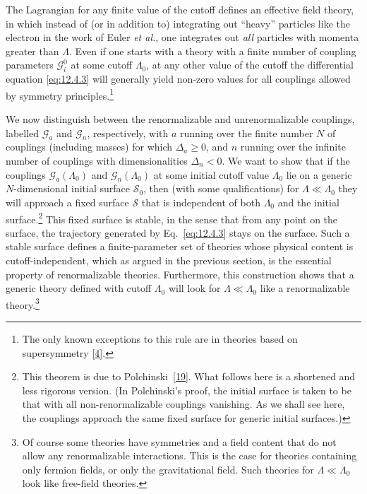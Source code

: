 The Lagrangian for any finite value of the cutoff defines an effective field
theory, in which instead of (or in addition to) integrating out ``heavy''
particles like the electron in the work of Euler \emph{et al.}, one integrates
out \emph{all} particles with momenta greater than $\Lambda$. Even if one
starts with a theory with a finite number of coupling parameters
$\mathcal G_i^0$ at some cutoff $\Lambda_0$, at any other value of the cutoff
the differential equation \eqref{eq:12.4.3} will generally yield non-zero
values for all couplings allowed by symmetry principles.\footnote{The only
known exceptions to this rule are in theories based on supersymmetry
\hyperref[ref:12.4]{[4]}.}

We now distinguish between the renormalizable and unrenormalizable couplings,
labelled $\mathcal G_a$ and $\mathcal G_n$, respectively, with $a$ running over
the finite number $N$ of couplings (including masses) for which
$\Delta_a\geq 0$, and $n$ running over the infinite number of couplings with
dimensionalities $\Delta_n<0$. We want to show that if the couplings
$\mathcal G_a(\Lambda_0)$ and $\mathcal G_n(\Lambda_0)$ at some initial cutoff
value $\Lambda_0$ lie on a generic $N$-dimensional initial surface
$\mathcal S_0$, then (with some qualifications) for $\Lambda\ll\Lambda_0$ they
will approach a fixed surface $\mathcal S$ that is independent of both
$\Lambda_0$ and the initial surface.\footnote{This theorem is due to
Polchinski~\hyperref[ref:12.19]{[19]}. What follows here is a shortened and less
rigorous version. (In Polchinski's proof, the initial surface is taken to be
that with all non-renormalizable couplings vanishing. As we shall see here,
the couplings approach the same fixed surface for generic initial surfaces.)}
This fixed surface is stable, in the sense that from any point on the surface,
the trajectory generated by Eq.~\eqref{eq:12.4.3} stays on the surface. Such a
stable surface defines a finite-parameter set of theories whose physical
content is cutoff-independent, which as argued in the previous section, is the
essential property of renormalizable theories. Furthermore, this construction
shows that a generic theory defined with cutoff $\Lambda_0$ will look for
$\Lambda\ll\Lambda_0$ like a renormalizable theory.\footnote{Of course some
theories have symmetries and a field content that do not allow any
renormalizable interactions. This is the case for theories containing only
fermion fields, or only the gravitational field. Such theories for
$\Lambda\ll\Lambda_0$ look like free-field theories.}

